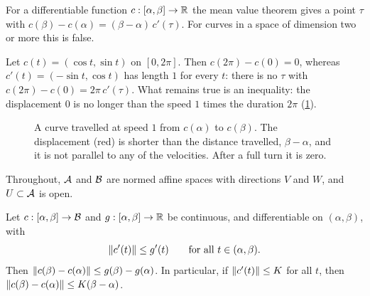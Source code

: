 \begin{notechapter}
For a differentiable function $c:[\alpha, \beta]\to\mathbb{R}$ the mean value
theorem gives a point $\tau$ with
$c(\beta) - c(\alpha) = (\beta - \alpha)\,c'(\tau)$. For curves in a space
of dimension two or more this is false.

\begin{example}\label{contractions-newton:ex:circle}
Let $c(t) = (\cos t, \sin t)$ on $[0, 2\pi]$. Then
$c(2\pi) - c(0) = 0$, whereas $c'(t) = (-\sin t, \cos t)$ has length $1$
for every $t$: there is no $\tau$ with
$c(2\pi) - c(0) = 2\pi\,c'(\tau)$. What remains true is an inequality:
the displacement $0$ is no longer than the speed $1$ times the duration
$2\pi$ (\cref{contractions-newton:fig:circle}).
\end{example}

\begin{figure}[ht]
\centering
{}
\caption{A curve travelled at speed $1$ from $c(\alpha)$ to $c(\beta)$.
The displacement (red) is shorter than the distance travelled,
$\beta - \alpha$, and it is not parallel to any of the velocities. After a
full turn it is zero.}
\label{contractions-newton:fig:circle}
\end{figure}

Throughout, $\mathcal{A}$ and $\mathcal{B}$ are normed affine spaces with directions $V$
and $W$, and $U\subset\mathcal{A}$ is open.

\begin{theorem}
\label{contractions-newton:thm:mvi-curve}
Let $c:[\alpha, \beta]\to\mathcal{B}$ and $g:[\alpha, \beta]\to\mathbb{R}$ be continuous,
and differentiable on $(\alpha, \beta)$, with
\[
  \left\|c'(t)\right\|\leq g'(t) \qquad\text{for all } t\in(\alpha, \beta) .
\]
Then $\left\|c(\beta) - c(\alpha)\right\|\leq g(\beta) - g(\alpha)$. In
particular, if $\left\|c'(t)\right\|\leq K$ for all $t$, then
$\left\|c(\beta) - c(\alpha)\right\|\leq K(\beta - \alpha)$.
\end{theorem}


\end{notechapter}
